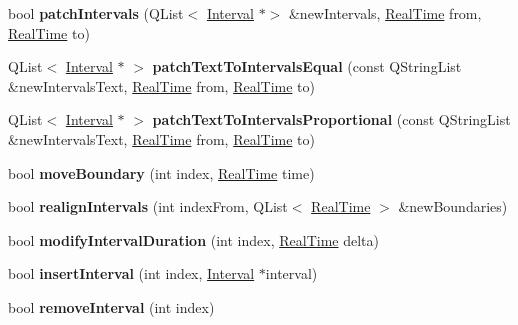 \begin{DoxyCompactItemize}
\item 
\mbox{\label{class_interval_tier_aec73874d5f67bd89ccfa3a818dbf47db}} 
bool {\bfseries patch\+Intervals} (Q\+List$<$ \hyperlink{class_interval}{Interval} $\ast$$>$ \&new\+Intervals, \hyperlink{struct_real_time}{Real\+Time} from, \hyperlink{struct_real_time}{Real\+Time} to)
\item 
\mbox{\label{class_interval_tier_aa5128d8086f506c41c93ce6ee5946d2a}} 
Q\+List$<$ \hyperlink{class_interval}{Interval} $\ast$ $>$ {\bfseries patch\+Text\+To\+Intervals\+Equal} (const Q\+String\+List \&new\+Intervals\+Text, \hyperlink{struct_real_time}{Real\+Time} from, \hyperlink{struct_real_time}{Real\+Time} to)
\item 
\mbox{\label{class_interval_tier_a27862a5cf994e21ec8db73312447cbc0}} 
Q\+List$<$ \hyperlink{class_interval}{Interval} $\ast$ $>$ {\bfseries patch\+Text\+To\+Intervals\+Proportional} (const Q\+String\+List \&new\+Intervals\+Text, \hyperlink{struct_real_time}{Real\+Time} from, \hyperlink{struct_real_time}{Real\+Time} to)
\item 
\mbox{\label{class_interval_tier_a83a898c0d4184204ca894d2b1c7c404f}} 
bool {\bfseries move\+Boundary} (int index, \hyperlink{struct_real_time}{Real\+Time} time)
\item 
\mbox{\label{class_interval_tier_a490b04a2ce00262d2d30e402e13727ba}} 
bool {\bfseries realign\+Intervals} (int index\+From, Q\+List$<$ \hyperlink{struct_real_time}{Real\+Time} $>$ \&new\+Boundaries)
\item 
\mbox{\label{class_interval_tier_aa2da6ea20a453a2ca2ee016f2f19192f}} 
bool {\bfseries modify\+Interval\+Duration} (int index, \hyperlink{struct_real_time}{Real\+Time} delta)
\item 
\mbox{\label{class_interval_tier_aca34a65aa1aa27a8f327cbed2bfda532}} 
bool {\bfseries insert\+Interval} (int index, \hyperlink{class_interval}{Interval} $\ast$interval)
\item 
\mbox{\label{class_interval_tier_a307f330261f6b3d8153b8a693fb73ea9}} 
bool {\bfseries remove\+Interval} (int index)
$$
\end{DoxyCompactItemize}
